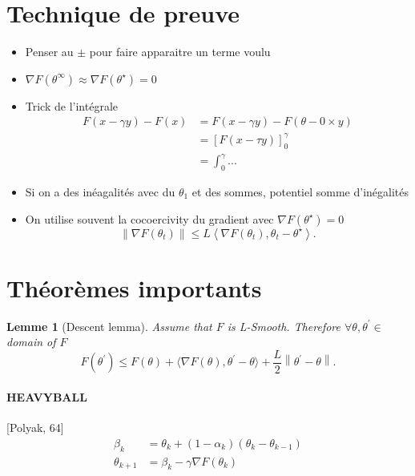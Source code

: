 \documentclass{article}
\theoremstyle{plain}%
\newtheorem{lem}[thm]{Lemme}
\theoremstyle{definition}
\theoremstyle{remark}
\begin{document}
\section{Technique de preuve}
\begin{itemize}
    \item Penser au $ \pm  $ pour faire apparaitre un terme voulu
    \item $ \nabla F(\theta ^\infty ) \approx \nabla F(\theta ^\star ) = 0 $ 
    \item Trick de l'intégrale \begin{align*}
        F(x - \gamma y) - F(x) &= F(x - \gamma y) - F(\theta - 0 \times y) \\
        &= \left[ F(x - \tau y) \right]_0 ^\gamma \\
        &= \int_{0}^{\gamma } ... 
    \end{align*}
    \item Si on a des inéagalités avec du $ \theta _1 $ et des sommes, potentiel somme d'inégalités
    \item On utilise souvent la cocoercivity du gradient avec $ \nabla F(\theta ^\star ) = 0 $ 
    \[
        \left\| \nabla F(\theta _t) \right\| \leq L \left\langle \nabla F(\theta _t), \theta _t - \theta ^\star  \right\rangle 
    .\]
     
\end{itemize}

\section{Théorèmes importants}
\begin{lem}[Descent lemma]
    Assume that $ F $  is L-Smooth. Therefore $ \forall \theta , \theta ^\prime \in  $ domain of $ F $ 
    \[
        F(\theta ^\prime ) \leq  F(\theta ) + \langle \nabla F(\theta ) , \theta ^\prime  - \theta \rangle + \frac{L}{2} \left\| \theta ^\prime  - \theta  \right\| 
    .\]
\end{lem}

\paragraph*{HEAVYBALL}[Polyak, 64]
\begin{align*}
    \beta _k &= \theta _k + (1 - \alpha _k) (\theta _k - \theta _{k-1}) \\
    \theta _{k+1} &= \beta _k - \gamma \nabla F(\theta _k)
\end{align*}
\end{document}
